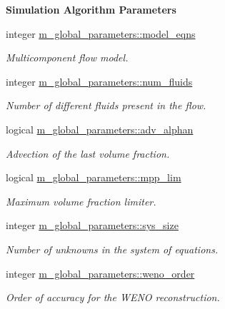 \begin{Indent}\textbf{ Simulation Algorithm Parameters}\par
\begin{DoxyCompactItemize}
\item 
integer \hyperlink{namespacem__global__parameters_a6cf2e92cfc3b519fb6da6fe9e88fab31}{m\+\_\+global\+\_\+parameters\+::model\+\_\+eqns}
\begin{DoxyCompactList}\small\item\em Multicomponent flow model. \end{DoxyCompactList}\item 
integer \hyperlink{namespacem__global__parameters_a2f0b96a5aef3925aa7e3cc816754e17e}{m\+\_\+global\+\_\+parameters\+::num\+\_\+fluids}
\begin{DoxyCompactList}\small\item\em Number of different fluids present in the flow. \end{DoxyCompactList}\item 
logical \hyperlink{namespacem__global__parameters_abebd95d9d0271fbda40f47f75a2d829b}{m\+\_\+global\+\_\+parameters\+::adv\+\_\+alphan}
\begin{DoxyCompactList}\small\item\em Advection of the last volume fraction. \end{DoxyCompactList}\item 
logical \hyperlink{namespacem__global__parameters_adc35ba450a192812db36f1d6659d64e6}{m\+\_\+global\+\_\+parameters\+::mpp\+\_\+lim}
\begin{DoxyCompactList}\small\item\em Maximum volume fraction limiter. \end{DoxyCompactList}\item 
integer \hyperlink{namespacem__global__parameters_a4dac2e4ead915635e0c6c33af87be01b}{m\+\_\+global\+\_\+parameters\+::sys\+\_\+size}
\begin{DoxyCompactList}\small\item\em Number of unknowns in the system of equations. \end{DoxyCompactList}\item 
integer \hyperlink{namespacem__global__parameters_ab8488205257dab4e94258eee55d0d1aa}{m\+\_\+global\+\_\+parameters\+::weno\+\_\+order}
\begin{DoxyCompactList}\small\item\em Order of accuracy for the W\+E\+NO reconstruction. \end{DoxyCompactList}\item 

\end{DoxyCompactItemize}
\end{Indent}

